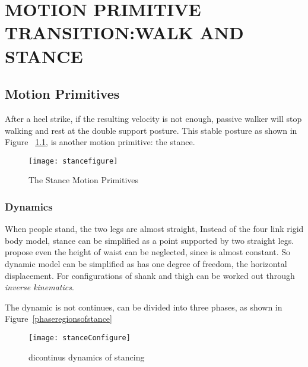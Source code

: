 
\chapter{MOTION PRIMITIVE TRANSITION:WALK AND STANCE}
\label{chap:stance}
    \graphicspath{{WalkStance/WalkStanceFigs/EPS/}{WalkStance/WalkStanceFigs/}}




\section{Motion Primitives}
After a  heel strike, if the resulting velocity is not enough, passive walker will stop walking and rest at the double support posture.
This stable posture as shown in Figure ~\ref{fig:bipedalstance}, is another motion primitive: the stance. 

\begin{figure}[!htbp]
  \begin{center}
      \texttt{[image: stancefigure]}
    \caption{The Stance Motion Primitives}
    \label{fig:bipedalstance}
\end{center}
\end{figure}


\subsection{Dynamics}
When people stand, the two legs are almost straight, 
Instead of the four link rigid body model, stance can be simplified as a point supported by two straight legs. 
\citet{stephens2009modeling} propose even the height of waist can be neglected, since is almost constant.
So dynamic model can be simplified as has one degree of freedom, the horizontal displacement.
For configurations of shank and thigh can be worked out through \emph{inverse kinematics}.
 




The dynamic is not continues, can be divided into three phases, as shown in Figure~\ref{phaseregionsofstance}

\begin{figure}[!htbp]
  \begin{center}
     \texttt{[image: stanceConfigure]}
    \caption{dicontinus dynamics of stancing}
    \label{fig:phaseregionsofstance}
\end{center}
\end{figure}



